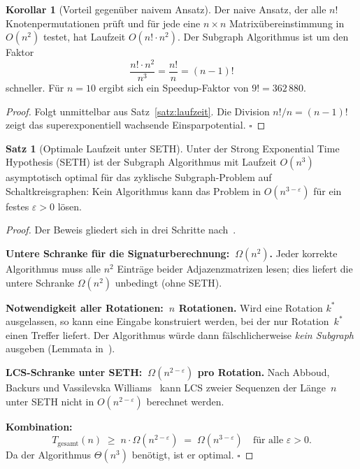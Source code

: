 ﻿\documentclass[a4paper,12pt]{article}
\theoremstyle{definition}
\newtheorem{satz}{Satz}
\newtheorem{korollar}{Korollar}
\begin{document}
\begin{korollar}[Vorteil gegenüber naivem Ansatz]
  \label{kor:speedup}
  Der naive Ansatz, der alle $n!$ Knotenpermu\-tationen prüft und für
  jede eine $n \times n$ Matrixübereinstimmung in $O(n^2)$ testet,
  hat Laufzeit $O(n!\cdot n^2)$. Der Subgraph Algorithmus ist um den
  Faktor
  \[
    \frac{n!\cdot n^2}{n^3} = \frac{n!}{n} = (n-1)!
  \]
  schneller. Für $n=10$ ergibt sich ein Speedup-Faktor von
  $9! = 362\,880$.
\end{korollar}

\begin{proof}
  Folgt unmittelbar aus Satz~\ref{satz:laufzeit}.
  Die Division $n!/n = (n-1)!$ zeigt das superexponentiell wachsende
  Einsparpotential. $\square$
\end{proof}

\begin{satz}[Optimale Laufzeit unter SETH]
  \label{satz:seth}
  Unter der Strong Exponential Time Hypothesis (SETH) ist der
  Subgraph Algorithmus mit Laufzeit $O(n^3)$ asymptotisch optimal
  für das zyklische Subgraph-Problem auf Schaltkreisgraphen:
  Kein Algorithmus kann das Problem in $O(n^{3-\varepsilon})$ für
  ein festes $\varepsilon > 0$ lösen.
\end{satz}

\begin{proof}
  Der Beweis gliedert sich in drei Schritte nach~\cite{epp2026subgraph}.

  \textbf{Untere Schranke für die Signaturberechnung:~$\Omega(n^2)$.}
  Jeder korrekte Algorithmus muss alle $n^2$ Einträge beider
  Adjazenz\-matrizen lesen; dies liefert die untere Schranke
  $\Omega(n^2)$ unbedingt (ohne SETH).

  \textbf{Notwendigkeit aller Rotationen:~$n$ Rotationen.}
  Wird eine Rotation $k^*$ ausgelassen, so kann eine Eingabe
  konstruiert werden, bei der nur Rotation~$k^*$ einen Treffer
  liefert. Der Algorithmus würde dann fälschlicherweise \emph{kein
  Subgraph} ausgeben (Lemmata in~\cite{epp2026subgraph}).

  \textbf{LCS-Schranke unter SETH:~$\Omega(n^{2-\varepsilon})$
  pro Rotation.}
  Nach Abboud, Backurs und Vassilevska Williams~\cite{abboud2015tight}
  kann LCS zweier Sequenzen der Länge~$n$ unter SETH nicht in
  $O(n^{2-\varepsilon})$ berechnet werden.

  \textbf{Kombination:}
  \[
    T_{\mathrm{gesamt}}(n)
    \;\geq\; n \cdot \Omega(n^{2-\varepsilon})
    \;=\; \Omega(n^{3-\varepsilon})
    \quad\text{für alle } \varepsilon>0.
  \]
  Da der Algorithmus $\Theta(n^3)$ benötigt, ist er optimal. $\square$
\end{proof}
\end{document}
